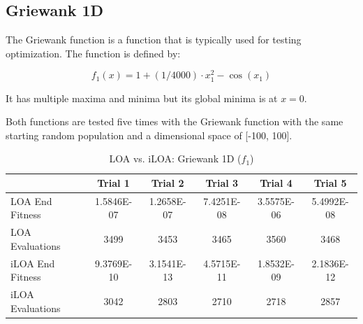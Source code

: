 \subsection{Griewank 1D}

\par The Griewank function is a function that is typically used for testing optimization. The function is defined by:

$$
f_1(x) = 1+(1/4000)\cdot x_1^2-\cos(x_1)
$$

It has multiple maxima and minima but its global minima is at $x=0$.

\par Both functions are tested five times with the Griewank function with the same starting random population and a dimensional space of [-100, 100].

\begin{table}[ht]
\scriptsize
\begin{tabular}{l|ccccc}
\textbf{}        & \textbf{Trial 1} & \textbf{Trial 2} & \textbf{Trial 3} & \textbf{Trial 4} & \textbf{Trial 5} \\
\hline
LOA End Fitness  & 1.5846E-07       & 1.2658E-07       & 7.4251E-08       & 3.5575E-06       & 5.4992E-08       \\
LOA Evaluations  & 3499             & 3453             & 3465             & 3560             & 3468             \\
iLOA End Fitness & 9.3769E-10       & 3.1541E-13       & 4.5715E-11       & 1.8532E-09       & 2.1836E-12       \\
iLOA Evaluations & 3042             & 2803             & 2710             & 2718             & 2857
\end{tabular}
\caption{ \scriptsize LOA vs. iLOA: Griewank 1D ($f_1$)}
\end{table}

